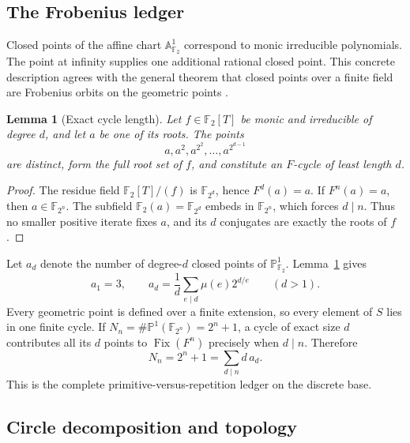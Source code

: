 \documentclass[11pt]{article}
\newtheorem{lemma}[theorem]{Lemma}
\theoremstyle{definition}
\theoremstyle{remark}
\newcommand{\F}{\mathbb{F}}
\newcommand{\Fix}{\operatorname{Fix}}
\begin{document}
\subsection{The Frobenius ledger}

Closed points of the affine chart \(\mathbb A^1_{\F_2}\) correspond to monic
irreducible polynomials.  The point at infinity supplies one additional
rational closed point.  This concrete description agrees with the general
theorem that closed points over a finite field are Frobenius orbits on the
geometric points \citep[Sec.~1.4]{Deligne1974}.

\begin{lemma}[Exact cycle length]
\label{lem:cycle}
Let \(f\in\F_2[T]\) be monic and irreducible of degree \(d\), and let \(a\)
be one of its roots.  The points
\[
  a,a^2,a^{2^2},\ldots,a^{2^{d-1}}
\]
are distinct, form the full root set of \(f\), and constitute an
\(F\)-cycle of least length \(d\).
\end{lemma}

\begin{proof}
The residue field \(\F_2[T]/(f)\) is \(\F_{2^d}\), hence \(F^d(a)=a\).
If \(F^n(a)=a\), then \(a\in\F_{2^n}\).  The subfield
\(\F_2(a)=\F_{2^d}\) embeds in \(\F_{2^n}\), which forces \(d\mid n\).
Thus no smaller positive iterate fixes \(a\), and its \(d\) conjugates are
exactly the roots of \(f\).
\end{proof}

Let \(a_d\) denote the number of degree-\(d\) closed points of
\(\mathbb P^1_{\F_2}\).  Lemma~\ref{lem:cycle} gives
\begin{equation}
  a_1=3,
  \qquad
  a_d=\frac1d\sum_{e\mid d}\mu(e)2^{d/e}\qquad(d>1).
  \label{eq:closed-count}
\end{equation}
Every geometric point is defined over a finite extension, so every element of
\(S\) lies in one finite cycle.  If
\(N_n=\#\mathbb P^1(\F_{2^n})=2^n+1\), a cycle of exact size \(d\) contributes
all its \(d\) points to \(\Fix(F^n)\) precisely when \(d\mid n\).  Therefore
\begin{equation}
  N_n=2^n+1=\sum_{d\mid n}d\,a_d.
  \label{eq:fixed-ledger}
\end{equation}
This is the complete primitive-versus-repetition ledger on the discrete base.

\subsection{Circle decomposition and topology}
\end{document}

